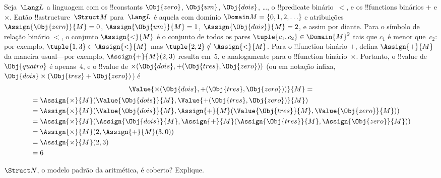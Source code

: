 \documentclass[../../../include/open-logic-section]{subfiles}
\begin{document}
\begin{ex}
Seja~$\Lang L$ a linguagem com os !!{constant}s $\Obj{zero}$,
$\Obj{um}$, $\Obj{dois}$, \dots, o !!{predicate} binário~$<$, e os
!!{function}s binários $+$ e $\times$. Então !!a{structure}~$\Struct
M$ para~$\Lang L$ é aquela com domínio $\Domain M = \{0, 1, 2, \ldots
\}$ e atribuições $\Assign{\Obj{zero}}{M} = 0$,
$\Assign{\Obj{um}}{M} = 1$, $\Assign{\Obj{dois}}{M} = 2$, e assim
por diante. Para o símbolo de relação binário $<$, o conjunto $\Assign{<}{M}$ é
o conjunto de todos os pares $\tuple{c_1, c_2} \in \Domain{M}^2$ tais que
$c_1$ é menor que~$c_2$: por exemplo, $\tuple{1, 3} \in
\Assign{<}{M}$ mas $\tuple{2, 2} \notin \Assign{<}{M}$. Para o
!!{function} binário $+$, defina $\Assign{+}{M}$ da maneira usual---por
exemplo, $\Assign{+}{M}(2,3)$ resulta em~$5$, e analogamente para o
!!{function} binário~$\times$. Portanto, o !!{value} de $\Obj{quatro}$ é
apenas~$4$, e o !!{value} de $\times(\Obj{dois},
+(\Obj{tres},\Obj{zero}))$ (ou em notação infixa, $\Obj{dois} \times
(\Obj{tres} + \Obj{zero})$) é
\begin{multline*}
\Value{\times(\Obj{dois}, +(\Obj{tres},\Obj{zero}))}{M} =\\
\begin{aligned}
& =\Assign{\times}{M}(\Value{\Obj{dois}}{M}, \Value{+(\Obj{tres}, \Obj{zero})}{M})\\
& = \Assign{\times}{M}(\Value{\Obj{dois}}{M}, \Assign{+}{M}(\Value{\Obj{tres}}{M},
\Value{\Obj{zero}}{M})) \\
& = \Assign{\times}{M}(\Assign{\Obj{dois}}{M}, \Assign{+}{M}(\Assign{\Obj{tres}}{M},
\Assign{\Obj{zero}}{M})) \\
& = \Assign{\times}{M}(2, \Assign{+}{M}(3, 0)) \\
& = \Assign{\times}{M}(2, 3) \\
& = 6
\end{aligned}
\end{multline*}
\end{ex}

\begin{prob}
$\Struct N$, o modelo padrão da aritmética, é coberto? Explique.
\end{prob}
\end{document}

